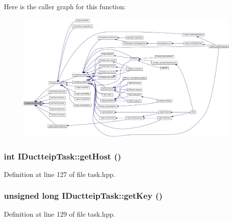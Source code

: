 Here is the caller graph for this function:\nopagebreak
\begin{figure}[H]
\begin{center}
\leavevmode
\includegraphics[width=420pt]{class_i_ductteip_task_ab4eb87b3c109c4a5c8a74c928ea3b8b5_icgraph}
\end{center}
\end{figure}
\hypertarget{class_i_ductteip_task_aff5c45921ef7de2e0a0261477fdbd323}{
\subsubsection[{getHost}]{\setlength{\rightskip}{0pt plus 5cm}int IDuctteipTask::getHost ()}}
\label{class_i_ductteip_task_aff5c45921ef7de2e0a0261477fdbd323}


Definition at line 127 of file task.hpp.\hypertarget{class_i_ductteip_task_adfbcbcb284c9dba335ce519bc27d4ff1}{
\subsubsection[{getKey}]{\setlength{\rightskip}{0pt plus 5cm}unsigned long IDuctteipTask::getKey ()}}
\label{class_i_ductteip_task_adfbcbcb284c9dba335ce519bc27d4ff1}


Definition at line 129 of file task.hpp.

